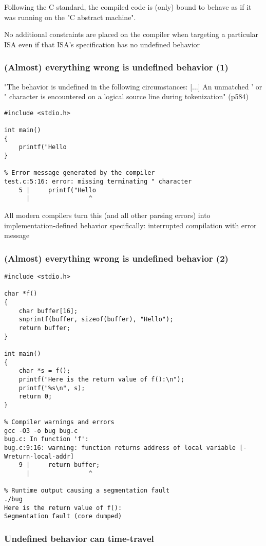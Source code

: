 \documentclass[12pt]{article}
\begin{document}
Following the C standard, the compiled code is (only) bound to behave as if it was running on the "C abstract machine".

No additional constraints are placed on the compiler when targeting a particular ISA even if that ISA's specification has no undefined behavior

\subsubsection{(Almost) everything wrong is undefined behavior (1)}
"The behavior is undefined in the following circumstances: [...]
An unmatched ' or " character is encountered on a logical source line during tokenization" (p584)

\begin{lstlisting}
#include <stdio.h>

int main()
{
    printf("Hello
}

% Error message generated by the compiler
test.c:5:16: error: missing terminating " character
    5 |     printf("Hello
      |                ^
\end{lstlisting}

All modern compilers turn this (and all other parsing errors) into implementation-defined behavior specifically: interrupted compilation with error message

\subsubsection{(Almost) everything wrong is undefined behavior (2)}
\begin{lstlisting}
#include <stdio.h>

char *f()
{
    char buffer[16]; 
    snprintf(buffer, sizeof(buffer), "Hello");
    return buffer;
}

int main()
{
    char *s = f();
    printf("Here is the return value of f():\n");
    printf("%s\n", s);
    return 0;
}

% Compiler warnings and errors
gcc -O3 -o bug bug.c
bug.c: In function 'f':
bug.c:9:16: warning: function returns address of local variable [-Wreturn-local-addr]
    9 |     return buffer;
      |                ^

% Runtime output causing a segmentation fault
./bug
Here is the return value of f():
Segmentation fault (core dumped)
\end{lstlisting}

\subsubsection{Undefined behavior can time-travel}
\end{document}
